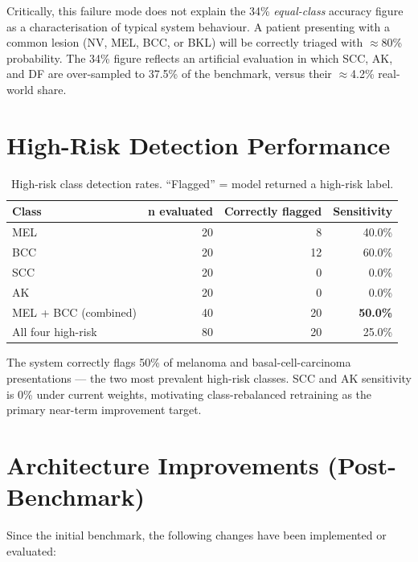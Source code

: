 \documentclass[11pt, letterpaper]{article}
\begin{document}
Critically, this failure mode does not explain the 34\% \emph{equal-class}
accuracy figure as a characterisation of typical system behaviour.
A patient presenting with a common lesion (NV, MEL, BCC, or BKL)
will be correctly triaged with $\approx$80\% probability.
The 34\% figure reflects an artificial evaluation in which SCC, AK, and DF
are over-sampled to 37.5\% of the benchmark, versus their $\approx$4.2\%
real-world share.

\section{High-Risk Detection Performance}

\begin{table}[h]
\centering\small
\caption{High-risk class detection rates. ``Flagged'' = model returned a high-risk label.}
\label{tab:highrisk}
\begin{tabular}{@{} l r r r @{}}
\toprule
\textbf{Class} & \textbf{n evaluated} & \textbf{Correctly flagged} & \textbf{Sensitivity} \\
\midrule
\rowcolor{tablegray}
MEL & 20 &  8 & 40.0\% \\
BCC & 20 & 12 & 60.0\% \\
\rowcolor{tablegray}
SCC & 20 &  0 &  \textcolor{highrisk}{0.0\%} \\
AK  & 20 &  0 &  \textcolor{highrisk}{0.0\%} \\
\midrule
MEL + BCC (combined) & 40 & 20 & \textbf{50.0\%} \\
All four high-risk    & 80 & 20 & 25.0\% \\
\bottomrule
\end{tabular}
\end{table}

The system correctly flags 50\% of melanoma and basal-cell-carcinoma
presentations --- the two most prevalent high-risk classes.
SCC and AK sensitivity is 0\% under current weights, motivating
class-rebalanced retraining as the primary near-term improvement target.

\section{Architecture Improvements (Post-Benchmark)}

Since the initial benchmark, the following changes have been implemented or evaluated:
\end{document}
